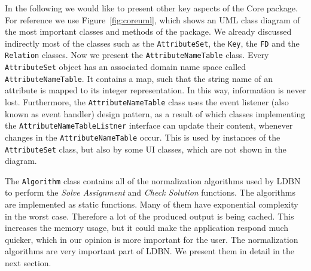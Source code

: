 In the following we would like to present other key aspects of the Core package. For reference we 
use Figure~\ref{fig:coreuml}, which shows an UML class diagram of the most important 
classes and methods of the package. We already discussed indirectly most of the classes such as the \verb=AttributeSet=,
the \verb=Key=, the \verb=FD= and the \verb=Relation= classes. Now we present the  
\verb=AttributeNameTable= class. Every \verb=AttributeSet= object has an associated domain name space called 
\verb=AttributeNameTable=. It contains a map, such that the string name of an attribute is mapped to its 
integer representation. In this way, information is never lost. 
Furthermore, the \verb=AttributeNameTable=
class uses the event listener (also known as event handler) design pattern, 
as a result of which classes implementing 
the \verb=AttributeNameTableListner= interface can update their content,
whenever changes in the \verb=AttributeNameTable= occur. This is used by instances of the 
\verb=AttributeSet= class, but also by some UI classes, which are not shown in the diagram. 

The \verb=Algorithm= class contains all of the normalization algorithms used by LDBN to perform 
the \textit{Solve Assignment} and \textit{Check Solution} functions. The algorithms are implemented 
as static functions. Many of them have exponential complexity in the worst
case. Therefore a lot of the produced output is being cached. This increases the
memory usage, but it could make the application respond much quicker, which
in our opinion is more important for the user. The normalization algorithms are very important 
part of LDBN. We present them in detail in the next section. 

